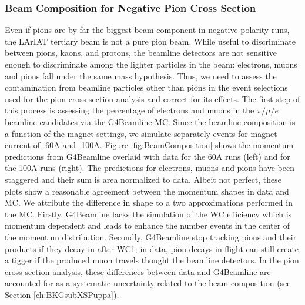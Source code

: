 \subsubsection{Beam Composition for Negative Pion Cross Section}
Even if pions are by far the biggest beam component in negative polarity runs, the LArIAT tertiary beam is not a pure pion beam. While useful to discriminate between pions, kaons, and protons, the beamline detectors are not sensitive enough to  discriminate among the lighter particles in the beam: electrons, muons and pions fall under the same mass hypothesis. Thus, we need to assess the contamination from beamline particles other than pions in the event selections used for the pion cross section analysis and correct for its effects. The first step of this process is assessing the percentage of electrons and muons in the $\pi/\mu/e$ beamline candidates via the G4Beamline MC. 
Since the beamline composition is a function of the magnet settings, we simulate separately events for magnet current of -60A and -100A. 
Figure \ref{fig:BeamComposition} shows the momentum predictions from G4Beamline overlaid with data for the 60A runs (left) and for the 100A runs (right). The predictions for electrons, muons and pions have been staggered and their sum is area normalized to data. Albeit not perfect, these plots show a reasonable agreement between the momentum shapes in data and MC.  We attribute the difference in shape to a two approximations performed in the MC. Firstly, G4Beamline lacks the simulation of the WC efficiency which is momentum dependent and leads to enhance the number events in the center of the momentum distribution. Secondly, G4Beamline stop tracking pions and their products if they decay in after WC1; in data, pion decays in flight can still create a tigger if the produced muon travels thought the beamline detectors. In the pion cross section analysis, these differences between data and G4Beamline are accounted for as a systematic uncertainty related to the beam composition (see Section \ref{ch:BKGsubXSPuppa}).


